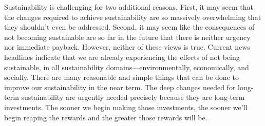 \documentclass{article}\usepackage[]{graphicx}\usepackage[]{xcolor}
\begin{document}
Sustainability is challenging for two additional reasons.
First, it may seem that the changes required to achieve sustainability are so
massively overwhelming that they shouldn't even be addressed.
Second, it may seem like the consequences of not becoming sustainable are so far
in the future that there is neither urgency nor immediate payback.
However, neither of these views is true.
Current news headlines indicate that we are already
experiencing the effects of not being sustainable, in all
sustainability domains---environmentally, economically, and socially.
There are many reasonable and simple things that can be done to improve our
sustainability in the near term.
The deep changes needed for long-term sustainability are urgently needed precisely because
they are long-term investments.
The sooner we begin making those investments, the sooner we'll begin reaping the
rewards and the greater those rewards will be.
\end{document}
